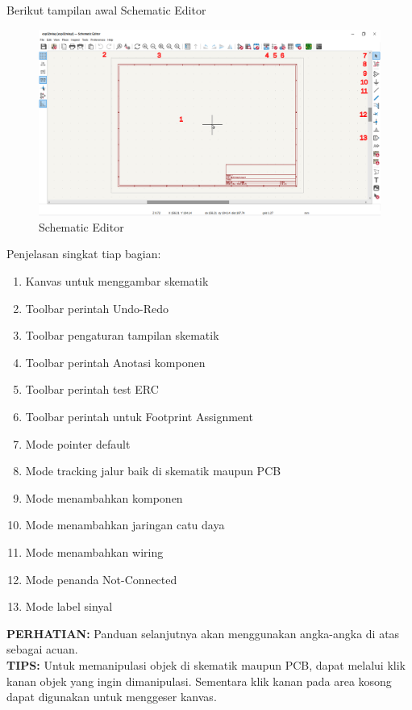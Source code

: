\documentclass[12pt]{book}
\begin{document}
	\newpage
	Berikut tampilan awal Schematic Editor
	\begin{figure}[!ht]
		\centering
		\includegraphics[width=\textwidth]{images/sch/sch_1}
		\caption{Schematic Editor}
	\end{figure}

	Penjelasan singkat tiap bagian:
	\begin{enumerate}[label=\textbf{\arabic*}.]
		\item Kanvas untuk menggambar skematik
		\item Toolbar perintah Undo-Redo
		\item Toolbar pengaturan tampilan skematik
		\item Toolbar perintah Anotasi komponen
		\item Toolbar perintah test ERC
		\item Toolbar perintah untuk Footprint Assignment
		\item Mode pointer default
		\item Mode tracking jalur baik di skematik maupun PCB
		\item Mode menambahkan komponen
		\item Mode menambahkan jaringan catu daya
		\item Mode menambahkan wiring
		\item Mode penanda Not-Connected
		\item Mode label sinyal
	\end{enumerate}

	\textbf{PERHATIAN:} Panduan selanjutnya akan menggunakan angka-angka di atas sebagai acuan.\\

	\textbf{TIPS:} Untuk memanipulasi objek di skematik maupun PCB, dapat melalui klik kanan objek yang ingin dimanipulasi.
	Sementara klik kanan pada area kosong dapat digunakan untuk menggeser kanvas.
\end{document}
